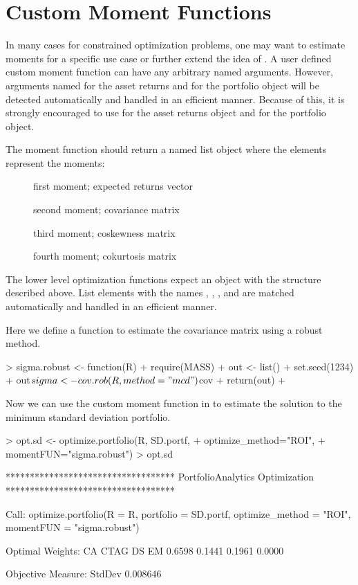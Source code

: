 \documentclass[a4paper]{article}
\begin{document}
\section{Custom Moment Functions}
In many cases for constrained optimization problems, one may want to estimate moments for a specific use case or further extend the idea of . A user defined custom moment function can have any arbitrary named arguments. However, arguments named  for the asset returns and  for the portfolio object will be detected automatically and handled in an efficient manner. Because of this, it is strongly encouraged to use  for the asset returns object and  for the portfolio object.

The moment function should return a named list object where the elements represent the moments:
\begin{description}
  \item[]{ first moment; expected returns vector}
  \item[]{ second moment; covariance matrix}
  \item[]{ third moment; coskewness matrix}
  \item[]{ fourth moment; cokurtosis matrix}
\end{description}

The lower level optimization functions expect an object with the structure described above. List elements with the names , , , and  are matched automatically and handled in an efficient manner.

Here we define a function to estimate the covariance matrix using a robust method.
\begin{Schunk}
\begin{Sinput}
> sigma.robust <- function(R){
+   require(MASS)
+   out <- list()
+   set.seed(1234)
+   out$sigma <- cov.rob(R, method="mcd")$cov
+   return(out)
+ }
\end{Sinput}
\end{Schunk}

Now we can use the custom moment function in  to estimate the solution to the minimum standard deviation portfolio.
\begin{Schunk}
\begin{Sinput}
> opt.sd <- optimize.portfolio(R, SD.portf, 
+                              optimize_method="ROI", 
+                              momentFUN="sigma.robust")
> opt.sd
\end{Sinput}
\begin{Soutput}
***********************************
PortfolioAnalytics Optimization
***********************************

Call:
optimize.portfolio(R = R, portfolio = SD.portf, optimize_method = "ROI", 
    momentFUN = "sigma.robust")

Optimal Weights:
    CA   CTAG     DS     EM 
0.6598 0.1441 0.1961 0.0000 

Objective Measure:
  StdDev 
0.008646 
\end{Soutput}
\end{Schunk}
\end{document}
